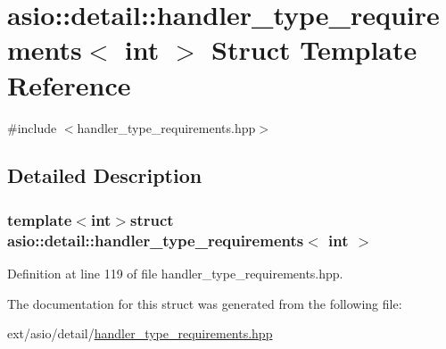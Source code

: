 \hypertarget{structasio_1_1detail_1_1handler__type__requirements}{}\section{asio\+:\+:detail\+:\+:handler\+\_\+type\+\_\+requirements$<$ int $>$ Struct Template Reference}
\label{structasio_1_1detail_1_1handler__type__requirements}


{\ttfamily \#include $<$handler\+\_\+type\+\_\+requirements.\+hpp$>$}



\subsection{Detailed Description}
\subsubsection*{template$<$int$>$struct asio\+::detail\+::handler\+\_\+type\+\_\+requirements$<$ int $>$}



Definition at line 119 of file handler\+\_\+type\+\_\+requirements.\+hpp.



The documentation for this struct was generated from the following file\+:\begin{DoxyCompactItemize}
\item 
ext/asio/detail/\hyperlink{handler__type__requirements_8hpp}{handler\+\_\+type\+\_\+requirements.\+hpp}\end{DoxyCompactItemize}
